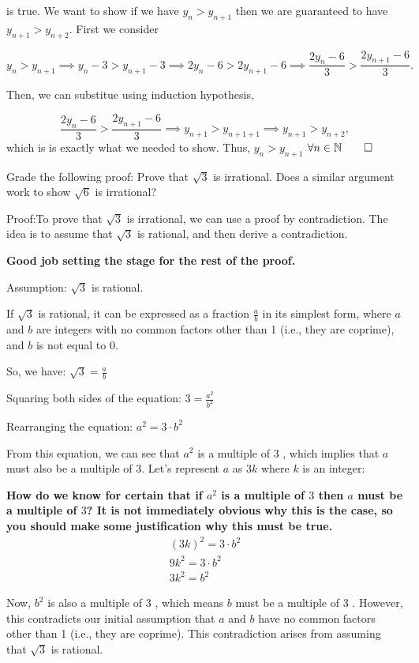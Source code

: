 \documentclass{report}
\begin{document}
is true. We want to show if we have $ y_n > y_{n+1}$ then we are guaranteed to have $y_{n+1} > y_{n+2}$. First we consider

$$y_n > y_{n+1} \implies  y_n -3  >  y_{n+1}-3 \implies  2y_n -6  >  2y_{n+1}-6 \implies \frac{2y_n -6 }{3} >  \frac{2y_{n+1}-6}{3}.$$


Then, we can substitue using induction hypothesis,


$$ \frac{2y_n -6 }{3} >  \frac{2y_{n+1}-6}{3} \implies y_{n+1} > y_{n+1+1} \implies y_{n+1} > y_{n+2},$$ 
which is is exactly what we needed to show. Thus, $ y_{n} > y_{n+1}$ $\forall n \in \mathbb{N} \qed$

\bigskip

\qs{}
{Grade the following proof: Prove that $\sqrt{3}$ is irrational. Does a similar argument work to show $\sqrt{6}$ is irrational?}

Proof:To prove that $\sqrt{3}$ is irrational, we can use a proof by contradiction. The idea is to assume that $\sqrt{3}$ is rational, and then derive a contradiction.

\textbf{Good job setting the stage for the rest of the proof.}

Assumption: $\sqrt{3}$ is rational.

If $\sqrt{3}$ is rational, it can be expressed as a fraction $\frac{a}{b}$ in its simplest form, where $a$ and $b$ are integers with no common factors other than 1 (i.e., they are coprime), and $b$ is not equal to 0.

So, we have: $\sqrt{3}=\frac{a}{b}$

Squaring both sides of the equation: $3=\frac{a^{2}}{b^{2}}$

Rearranging the equation: $a^{2}=3 \cdot b^{2}$

From this equation, we can see that $a^{2}$ is a multiple of 3 , which implies that $a$ must also be a multiple of 3. Let's represent $a$ as $3 k$ where $k$ is an integer:

\textbf{
How do we know for certain  that if $a^2$ is a multiple of  $3$ then $a$ must be a multiple of $3$? It is not immediately obvious why this is the case, so you should make some justification why this must be true.
}
$$
\begin{gathered}
(3 k)^{2}=3 \cdot b^{2} \\
9 k^{2}=3 \cdot b^{2} \\
3 k^{2}=b^{2}
\end{gathered}
$$

Now, $b^{2}$ is also a multiple of 3 , which means $b$ must be a multiple of 3 . However, this contradicts our initial assumption that $a$ and $b$ have no common factors other than 1 (i.e., they are coprime). This contradiction arises from assuming that $\sqrt{3}$ is rational.
\end{document}
